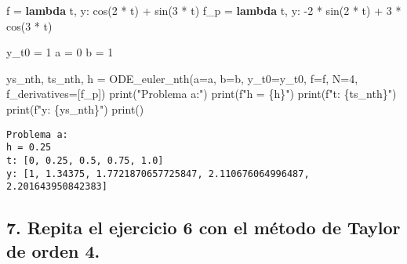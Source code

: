 \documentclass[
  letterpaper,
  DIV=11,
  numbers=noendperiod]{scrartcl}
\newenvironment{Shaded}{\begin{snugshade}}{\end{snugshade}}
\newcommand{\BuiltInTok}[1]{\textcolor[rgb]{0.00,0.23,0.31}{#1}}
\newcommand{\DecValTok}[1]{\textcolor[rgb]{0.68,0.00,0.00}{#1}}
\newcommand{\KeywordTok}[1]{\textcolor[rgb]{0.00,0.23,0.31}{\textbf{#1}}}
\newcommand{\NormalTok}[1]{\textcolor[rgb]{0.00,0.23,0.31}{#1}}
\newcommand{\OperatorTok}[1]{\textcolor[rgb]{0.37,0.37,0.37}{#1}}
\newcommand{\SpecialCharTok}[1]{\textcolor[rgb]{0.37,0.37,0.37}{#1}}
\newcommand{\SpecialStringTok}[1]{\textcolor[rgb]{0.13,0.47,0.30}{#1}}
\newcommand{\StringTok}[1]{\textcolor[rgb]{0.13,0.47,0.30}{#1}}
\begin{document}
\begin{Shaded}
\begin{Highlighting}[]
\NormalTok{f }\OperatorTok{=} \KeywordTok{lambda}\NormalTok{ t, y: cos(}\DecValTok{2} \OperatorTok{*}\NormalTok{ t) }\OperatorTok{+}\NormalTok{ sin(}\DecValTok{3} \OperatorTok{*}\NormalTok{ t)}
\NormalTok{f\_p }\OperatorTok{=} \KeywordTok{lambda}\NormalTok{ t, y: }\OperatorTok{{-}}\DecValTok{2} \OperatorTok{*}\NormalTok{ sin(}\DecValTok{2} \OperatorTok{*}\NormalTok{ t) }\OperatorTok{+} \DecValTok{3} \OperatorTok{*}\NormalTok{ cos(}\DecValTok{3} \OperatorTok{*}\NormalTok{ t)}

\NormalTok{y\_t0 }\OperatorTok{=} \DecValTok{1}
\NormalTok{a }\OperatorTok{=} \DecValTok{0}
\NormalTok{b }\OperatorTok{=} \DecValTok{1}

\NormalTok{ys\_nth, ts\_nth, h }\OperatorTok{=}\NormalTok{ ODE\_euler\_nth(a}\OperatorTok{=}\NormalTok{a, b}\OperatorTok{=}\NormalTok{b, y\_t0}\OperatorTok{=}\NormalTok{y\_t0, f}\OperatorTok{=}\NormalTok{f, N}\OperatorTok{=}\DecValTok{4}\NormalTok{, f\_derivatives}\OperatorTok{=}\NormalTok{[f\_p])}
\BuiltInTok{print}\NormalTok{(}\StringTok{"Problema a:"}\NormalTok{)}
\BuiltInTok{print}\NormalTok{(}\SpecialStringTok{f"h = }\SpecialCharTok{\{}\NormalTok{h}\SpecialCharTok{\}}\SpecialStringTok{"}\NormalTok{)}
\BuiltInTok{print}\NormalTok{(}\SpecialStringTok{f"t: }\SpecialCharTok{\{}\NormalTok{ts\_nth}\SpecialCharTok{\}}\SpecialStringTok{"}\NormalTok{)}
\BuiltInTok{print}\NormalTok{(}\SpecialStringTok{f"y: }\SpecialCharTok{\{}\NormalTok{ys\_nth}\SpecialCharTok{\}}\SpecialStringTok{"}\NormalTok{)}
\BuiltInTok{print}\NormalTok{()}
\end{Highlighting}
\end{Shaded}

\begin{verbatim}
Problema a:
h = 0.25
t: [0, 0.25, 0.5, 0.75, 1.0]
y: [1, 1.34375, 1.7721870657725847, 2.110676064996487, 2.201643950842383]
\end{verbatim}

\subsection{7. Repita el ejercicio 6 con el método de Taylor de orden
4.}\label{repita-el-ejercicio-6-con-el-muxe9todo-de-taylor-de-orden-4.}
\end{document}
